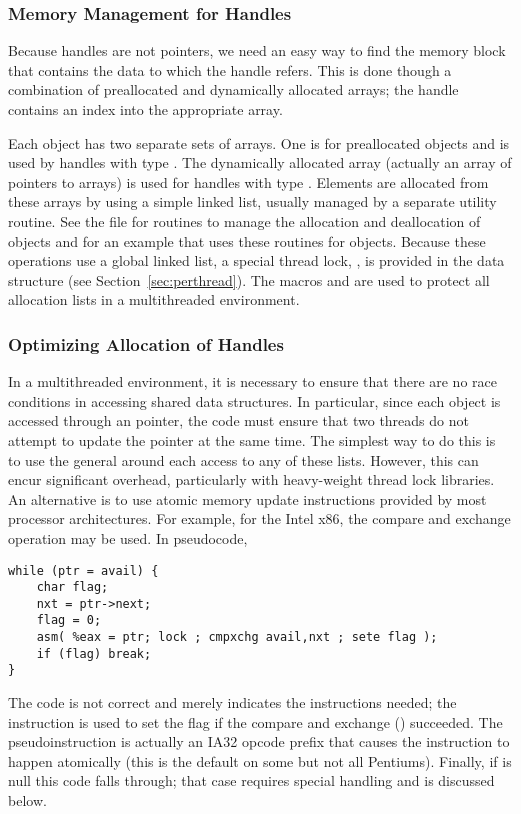\documentclass{article}
\begin{document}
\subsubsection{Memory Management for Handles}
\label{sec:handle-mem-mng}
Because handles are not pointers, we need an easy way to find the
memory block that contains the data to which the handle refers.  
This is done though a combination of preallocated and dynamically
allocated arrays; the handle contains an index into the appropriate
array.  

Each object has two separate sets of arrays.  One is for preallocated
objects and is
used by handles with type .  The dynamically
allocated array 
(actually an array of pointers to arrays) is used for handles with
type .  Elements are allocated from these
arrays by using a simple linked list, usually managed by a separate
utility routine.  See the file  for routines to
manage the allocation and deallocation of objects and
 for an example that uses these routines for
 objects.
Because these operations use a global linked list, a special thread
lock, , is provided in the 
data structure (see Section~\ref{sec:perthread}).  The macros
 and 
 are used to protect all allocation
lists in a multithreaded environment.

\subsubsection{Optimizing Allocation of Handles}
\label{sec:optimizing-handle-alloc}
In a multithreaded environment, it is necessary to ensure that there are no
race conditions in accessing shared data structures.  In particular, since
each object is accessed through an  pointer, the code must ensure
that two threads do not attempt to update the  pointer at the same
time.  The simplest way to do this is to use the general
 around each access to any of these
lists.  However, this can encur significant overhead, particularly with
heavy-weight thread lock libraries.  An alternative is to use atomic memory
update instructions provided by most processor architectures.  For example,
for the Intel x86, the compare and exchange operation may be used.  In
pseudocode, 
\begin{verbatim}
while (ptr = avail) {
    char flag;
    nxt = ptr->next; 
    flag = 0;
    asm( %eax = ptr; lock ; cmpxchg avail,nxt ; sete flag );
    if (flag) break;
}
\end{verbatim}
The  code is not correct and merely indicates the instructions
needed; the  instruction is used to set the flag if the compare and
exchange () succeeded.  The pseudoinstruction  is
actually an IA32 opcode prefix that causes the 
instruction to happen 
atomically (this is the default on some but not all Pentiums).  Finally,
if  is null this code falls through; that case requires special
handling and is discussed below.
\end{document}
